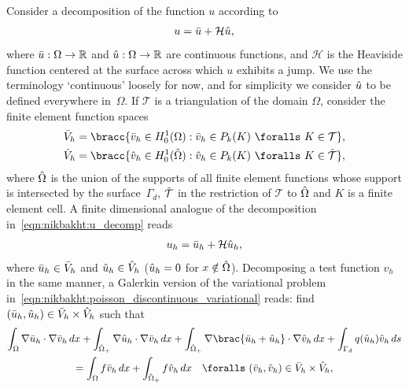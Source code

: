Consider a decomposition of the function $u$ according to
%
\begin{equation}
  u = \Bar{u} + \mathcal{H} \Hat{u},
\label{eqn:nikbakht:u_decomp}
\end{equation}
%
where $\Bar{u}: \Omega \rightarrow \mathbb{R}$ and $\Hat{u}: \Omega
\rightarrow \mathbb{R}$ are continuous functions, and $\mathcal{H}$ is
the Heaviside function centered at the surface across which $u$ exhibits
a jump.  We use the terminology `continuous' loosely for now, and for
simplicity we consider $\Hat{u}$ to be defined everywhere in~$\Omega$.
If $\mathcal{T}$ is a triangulation of the domain $\Omega$, consider
the finite element function spaces
%
\begin{align}
  \Bar{V}_{h} &= \bracc{\Bar{v}_{h} \in H^{1}_{0}(\Omega)
                    : \Bar{v}_{h} \in P_{k}(K) \ \foralls \ K \in \mathcal{T}},
\\
  \Hat{V}_{h} &= \bracc{\Hat{v}_{h} \in H^{1}_{0}(\Hat{\Omega})
                    : \Hat{v}_{h} \in P_{k}(K) \ \foralls \ K \in \Hat{\mathcal{T}}},
\end{align}
%
where $\Hat{\Omega}$ is the union of the supports of all finite element
functions whose support is intersected by the surface~$\Gamma_{d}$,
$\Hat{\mathcal{T}}$ in the restriction of $\mathcal{T}$ to $\Hat{\Omega}$
and $K$ is a finite element cell.  A finite dimensional analogue of the
decomposition in~\eqref{eqn:nikbakht:u_decomp} reads
%
\begin{equation}
  u_{h} = \Bar{u}_{h} + \mathcal{H} \Hat{u}_{h},
  \label{eqn:nikbakht:u_h_decomp}
\end{equation}
%
where $\Bar{u}_{h} \in \Bar{V}_{h}$ and $\Hat{u}_{h}
\in \Hat{V}_{h}$ ($\Hat{u}_{h} = 0$ for $x \notin
\Hat{\Omega}$).  Decomposing a test function $v_{h}$ in the
same manner, a Galerkin version of the variational problem
in~\eqref{eqn:nikbakht:poisson_discontinuous_variational} reads: find
$(\Bar{u}_{h}, \Hat{u}_{h}) \in \Bar{V}_{h} \times \Hat{V}_{h}$ such that
%
\begin{multline}
     \int_{\Omega} \nabla \Bar{u}_{h} \cdot \nabla \Bar{v}_{h} \dif x
     + \int_{\Hat{\Omega}_{+}} \nabla \Hat{u}_{h} \cdot  \nabla \Bar{v}_{h} \dif x
     + \int_{\Hat{\Omega}_{+}}  \nabla \brac{\Bar{u}_{h} + \Hat{u}_{h}} \cdot \nabla \Hat{v}_{h} \dif x
     + \int_{\Gamma_d} q(\Hat{u}_h)\Hat{v}_h \dif s
\\
  =
   \int_{\Omega} f \Bar{v}_{h} \dif x
 + \int_{\Hat{\Omega}_{+}}  f \Hat{v}_{h} \dif x
      \quad \foralls \ (\Bar{v}_{h}, \Hat{v}_{h}) \in \Bar{V}_{h} \times \Hat{V}_{h},
\label{eqn:nikbakht:poisson_expanded_discontinuous_variational}
\end{multline}
